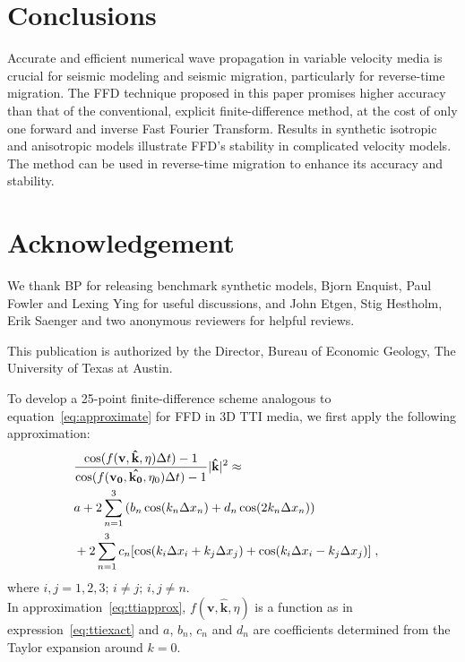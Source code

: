 \section{Conclusions}
Accurate and efficient numerical wave propagation in variable velocity media is crucial for seismic modeling and seismic migration,
particularly for reverse-time migration.
The FFD technique proposed in this paper promises higher accuracy than that of the conventional, explicit finite-difference method, 
at the cost of only one forward and inverse Fast Fourier Transform.
Results in synthetic isotropic and anisotropic models illustrate FFD's stability in complicated velocity models. 
The method can be used in reverse-time migration to enhance its accuracy and stability.

\section{Acknowledgement}

We thank BP for releasing benchmark synthetic models, Bjorn Enquist, Paul Fowler and Lexing Ying for useful discussions, and John Etgen, Stig Hestholm, Erik Saenger and two anonymous reviewers for helpful reviews. 

This publication is authorized by the Director, Bureau of Economic
Geology, The University of Texas at Austin.


To develop a 25-point finite-difference scheme analogous to equation~\ref{eq:approximate} for FFD in 3D TTI media, we first apply the following approximation:
\begin{eqnarray}
\label{eq:ttiapprox} 
\lefteqn{\frac{\cos(f(\mathbf{v},\mathbf{\hat{k}},\eta)\Delta t)-1}{\cos(f(\mathbf{v_0},\mathbf{\hat{k_0}},\eta_0)\Delta t)-1}|\mathbf{\hat{k}}|^2 \approx  } \\
\displaystyle & a + 2 \sum^{3}_{n=1}{(b_n\cos(k_n\Delta x_n)+d_n\cos(2k_n\Delta x_n))} \nonumber \\
\displaystyle & + 2 \sum^{3}_{n=1}{c_n [\cos(k_i\Delta x_i+k_j\Delta x_j) + \cos(k_i\Delta x_i-k_j\Delta x_j)]} \nonumber \;,\nonumber 
\end{eqnarray} 
where $i,j=1,2,3;\,i\neq j;\,i,j\neq n$.\\

In approximation~\ref{eq:ttiapprox},
$f(\mathbf{v},\mathbf{\hat{k}},\eta)$ is a function as in expression~\ref{eq:ttiexact} and $a$, $b_n$, $c_n$ and $d_n$ are coefficients determined from the Taylor expansion around $k=0$.\\ 

